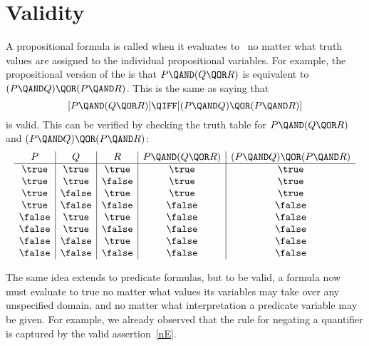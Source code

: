 \iffalse
Logicians have worked very hard to define strict rules for the
use of logic notation so that ideas can be expressed with absolute rigor.
It's all quite charming and clever.  However, the sad irony is that
applied mathematicians usually use their beloved notation as a crude
shorthand, breaking the rules and abusing the notation willy-nilly---sort
of like pounding nails with fine china.
\fi

\section{Validity}\label{sec:validity}

A propositional formula is called  when it evaluates to \true\
no matter what truth values are assigned to the individual propositional
variables.  For example, the propositional version of the 
is that $P \QAND (Q \QOR R)$ is equivalent to $(P \QAND Q) \QOR (P \QAND
R)$.  This is the same as saying that
\begin{equation}\label{eq:distributive_law}
[P \QAND (Q \QOR R)] \QIFF [(P \QAND Q) \QOR (P \QAND R)]
\end{equation}
is valid.  This can be verified by checking the truth table for $P
\QAND (Q \QOR R)$ and $(P \QAND Q) \QOR (P \QAND R)$:
\begin{equation*}
\begin{array}{c|c|c|c|c}

P & Q & R & P \QAND (Q \QOR R) & (P \QAND Q) \QOR (P \QAND R) \\
\hline

\true & \true  & \true   & \true  & \true \\
\true & \true  & \false  & \true  & \true \\
\true & \false & \true   & \true  & \true \\
\true & \false & \false  & \false & \false \\

\false & \true  & \true  & \false & \false \\
\false & \true  & \false & \false & \false \\
\false & \false & \true  & \false & \false \\
\false & \false & \false & \false & \false

\end{array}
\end{equation*}

The same idea extends to predicate formulas, but to be valid, a
formula now must evaluate to true no matter what values its variables
may take over any unspecified domain, and no matter what
interpretation a predicate variable may be given.  For example, we
already observed that the rule for negating a quantifier is captured
by the valid assertion~\eqref{nE}.

